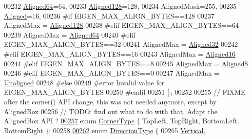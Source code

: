\begin{DoxyCode}
00232   \hyperlink{group__enums_gga45fe06e29902b7a2773de05ba27b47a1a0f4f4451618a2e67cade6b54ca0fc84b}{Aligned64}=64,       
00233   \hyperlink{group__enums_gga45fe06e29902b7a2773de05ba27b47a1a86400b6f9ebc01d9997b12512f3ea5fc}{Aligned128}=128,     
00234   AlignedMask=255,
00235   \hyperlink{group__enums_gga45fe06e29902b7a2773de05ba27b47a1ad37d4c71425bb286e9b4103830538fbf}{Aligned}=16,         
00236 \textcolor{preprocessor}{#if EIGEN\_MAX\_ALIGN\_BYTES==128}
00237   AlignedMax = \hyperlink{group__enums_gga45fe06e29902b7a2773de05ba27b47a1a86400b6f9ebc01d9997b12512f3ea5fc}{Aligned128}
00238 \textcolor{preprocessor}{#elif EIGEN\_MAX\_ALIGN\_BYTES==64}
00239   AlignedMax = \hyperlink{group__enums_gga45fe06e29902b7a2773de05ba27b47a1a0f4f4451618a2e67cade6b54ca0fc84b}{Aligned64}
00240 \textcolor{preprocessor}{#elif EIGEN\_MAX\_ALIGN\_BYTES==32}
00241   AlignedMax = \hyperlink{group__enums_gga45fe06e29902b7a2773de05ba27b47a1a7797d247b86f6e9837cc338beb6060de}{Aligned32}
00242 \textcolor{preprocessor}{#elif EIGEN\_MAX\_ALIGN\_BYTES==16}
00243   AlignedMax = \hyperlink{group__enums_gga45fe06e29902b7a2773de05ba27b47a1af8e2bf74b04c02199f62c5e3c06dbfcc}{Aligned16}
00244 \textcolor{preprocessor}{#elif EIGEN\_MAX\_ALIGN\_BYTES==8}
00245   AlignedMax = \hyperlink{group__enums_gga45fe06e29902b7a2773de05ba27b47a1ae9267ee4260c25c5b162ae72bf18a7bd}{Aligned8}
00246 \textcolor{preprocessor}{#elif EIGEN\_MAX\_ALIGN\_BYTES==0}
00247   AlignedMax = \hyperlink{group__enums_gga45fe06e29902b7a2773de05ba27b47a1ac935220b4c844108e183ebe30a4d5204}{Unaligned}
00248 \textcolor{preprocessor}{#else}
00249 \textcolor{preprocessor}{#error Invalid value for EIGEN\_MAX\_ALIGN\_BYTES}
00250 \textcolor{preprocessor}{#endif}
00251 \};
00252 
00255 \textcolor{comment}{// FIXME after the corner() API change, this was not needed anymore, except by AlignedBox}
00256 \textcolor{comment}{// TODO: find out what to do with that. Adapt the AlignedBox API ?}
\hyperlink{group__enums_gaafc7e22c8efbfefd5997e2cd9ec223e0}{00257} \textcolor{keyword}{enum} \hyperlink{group__enums_gaafc7e22c8efbfefd5997e2cd9ec223e0}{CornerType} \{ TopLeft, TopRight, BottomLeft, BottomRight \};
00258 
\hyperlink{group__enums_gad49a7b3738e273eb00932271b36127f7}{00262} \textcolor{keyword}{enum} \hyperlink{group__enums_gad49a7b3738e273eb00932271b36127f7}{DirectionType} \{ 
00265   \hyperlink{group__enums_ggad49a7b3738e273eb00932271b36127f7addca718e0564723df21d61b94b1198be}{Vertical}, 

\end{DoxyCode}

